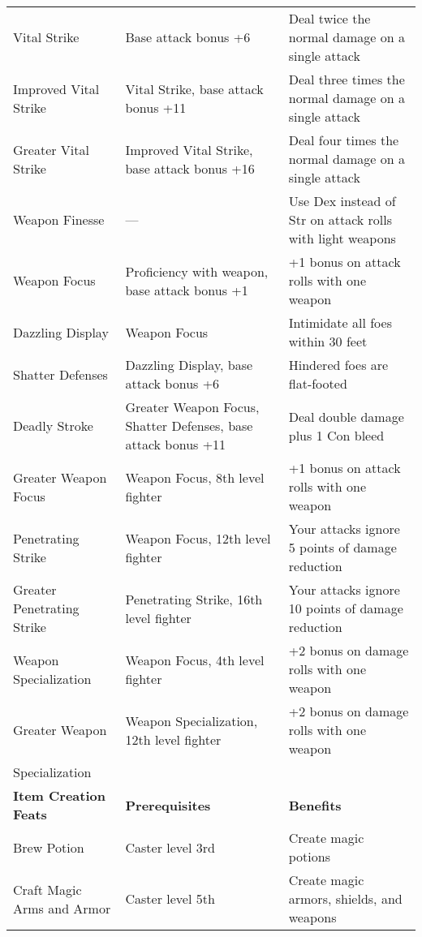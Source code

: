 \begin{table*}
  \sffamily
  \fontsize{9.5}{11.4}\selectfont

  \setlength{\tabcolsep}{1pt}
\begin{tabularx}{\linewidth}{lXl}
Vital Strike & Base attack bonus +6 & Deal twice the normal damage on a single attack\\
\enspace Improved Vital Strike & Vital Strike, base attack bonus +11 & Deal three times the normal damage on a single attack\\
\enspace \enspace Greater Vital Strike & Improved Vital Strike, base attack bonus +16 & Deal four times the normal damage on a single attack\\
Weapon Finesse & --- & Use Dex instead of Str on attack rolls with light weapons\\
Weapon Focus & Proficiency with weapon, base attack bonus +1 & +1 bonus on attack rolls with one weapon\\
\enspace Dazzling Display & Weapon Focus & Intimidate all foes within 30 feet\\
\enspace \enspace Shatter Defenses & Dazzling Display, base attack bonus +6 & Hindered foes are flat-footed \\
\enspace \enspace \enspace Deadly Stroke & Greater Weapon Focus, Shatter Defenses, base attack bonus +11 & Deal double damage plus 1 Con bleed \\
\enspace Greater Weapon Focus & Weapon Focus, 8th level fighter & +1 bonus on attack rolls with one weapon\\
\enspace Penetrating Strike & Weapon Focus, 12th level fighter & Your attacks ignore 5 points of damage reduction\\
\enspace \enspace Greater Penetrating Strike & Penetrating Strike, 16th level fighter & Your attacks ignore 10 points of damage reduction\\
\enspace Weapon Specialization & Weapon Focus, 4th level fighter & +2 bonus on damage rolls with one weapon\\
\enspace \enspace Greater Weapon & Weapon Specialization, 12th level fighter & +2 bonus on damage rolls with one weapon\\
\enspace \enspace Specialization \\
\textbf{Item Creation Feats} & \textbf{Prerequisites} & \textbf{Benefits}\\
Brew Potion & Caster level 3rd & Create magic potions\\
Craft Magic Arms and Armor & Caster level 5th & Create magic armors, shields, and weapons\\

\end{tabularx}
\end{table*}
